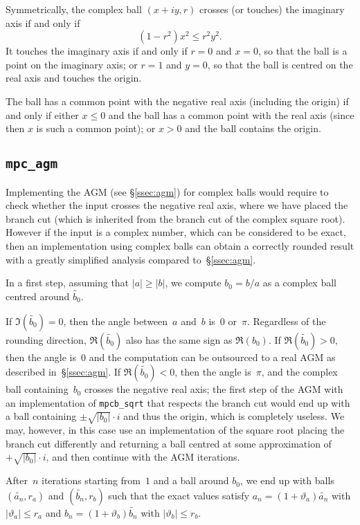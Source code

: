 \documentclass [11pt]{article}
\newcommand {\appro}[1]{\widetilde {#1}}
\renewcommand {\theta}{\vartheta}
\renewcommand {\leq}{\leqslant}
\renewcommand {\geq}{\geqslant}
\begin{document}
Symmetrically, the complex ball $(x + i y, r)$ crosses (or touches) the
imaginary axis if and only if
\[
\left(1 - r^2 \right) x^2 \leq r^2 y^2.
\]
It touches the imaginary axis if and only if $r = 0$ and $x = 0$, so that
the ball is a point on the imaginary axis; or $r = 1$ and $y = 0$, so that
the ball is centred on the real axis and touches the origin.

The ball has a common point with the negative real axis (including the
origin) if and only if either $x \leq 0$ and the ball has a common point
with the real axis (since then $x$ is such a common point); or $x > 0$
and the ball contains the origin.


\subsection {\texttt {mpc\_agm}}

Implementing the AGM (see \S\ref {ssec:agm}) for complex balls would
require to check whether the input crosses the negative real axis, where
we have placed the branch cut (which is inherited from the branch cut
of the complex square root). However if the input is a complex number,
which can be considered to be exact, then an implementation using complex
balls can obtain a correctly rounded result with a greatly simplified
analysis compared to~\S\ref {ssec:agm}.

In a first step, assuming that $|a| \geq |b|$, we compute
$b_0 = b / a$ as a complex ball centred around $\appro {b_0}$.

If $\Im (\appro {b_0}) = 0$, then the angle between~$a$ and~$b$
is~$0$ or~$\pi$. Regardless of the rounding direction, $\Re (\appro {b_0})$
also has the same sign as $\Re (b_0)$. If $\Re (\appro {b_0}) > 0$,
then the angle is~$0$ and the computation can be outsourced to a real AGM
as described in~\S\ref {ssec:agm}.
If $\Re (\appro {b_0}) < 0$, then the angle is~$\pi$, and the complex ball
containing~$b_0$ crosses the negative real axis; the first step of the AGM
with an implementation of \texttt {mpcb\_sqrt} that respects the branch cut
would end up with a ball containing $\pm \sqrt {|b_0|} \cdot i$ and thus
the origin, which is completely useless. We may, however, in this case use
an implementation of the square root placing the branch cut differently and
returning a ball centred at some approximation of $+ \sqrt {|b_0|} \cdot i$,
and then continue with the AGM iterations.

After~$n$ iterations starting from~$1$ and a ball around $b_0$, we end
up with balls $(\appro {a_n}, r_a)$ and $(\appro {b_n}, r_b)$ such
that the exact values satisfy $a_n = (1 + \theta_a) \appro {a_n}$
with $|\theta_a| \leq r_a$ and $b_n = (1 + \theta_b) \appro {b_n}$
with $|\theta_b| \leq r_b$.
\end{document}

